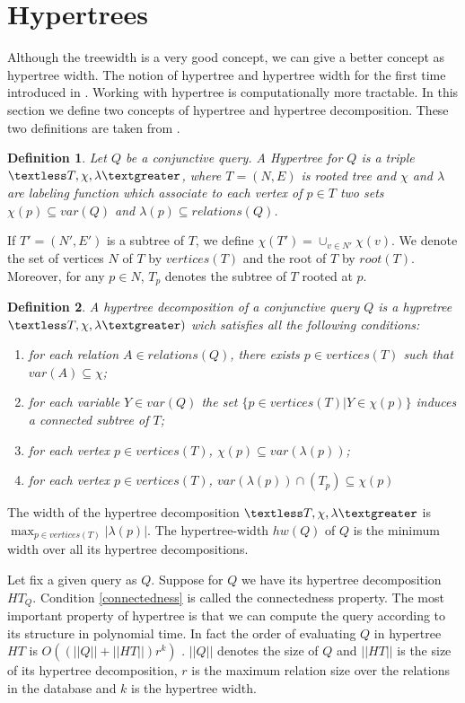\documentclass[12pt]{article}
\newtheorem{definition}{Definition}
\begin{document}
\section{Hypertrees}
Although the treewidth is a very good concept, we can give a better concept as hypertree width. The notion of hypertree and hypertree width for the first time introduced in \cite{1}. Working with hypertree is computationally more tractable. 
In this section we define two concepts of hypertree and hypertree decomposition.
These two definitions are taken from \cite{1}.
\begin{definition}
\label{def:ht}
Let $Q$ be a conjunctive query. A Hypertree for $Q$ is a triple $\textless T,\chi,\lambda\textgreater$, where  $T=(N,E)$ is rooted tree and $\chi$ and $\lambda$ are labeling function which associate to each vertex of $p\in T$ two sets $\chi(p)\subseteq var(Q)$ and $\lambda(p)\subseteq relations(Q)$.
\end{definition}
If $T'=(N',E')$ is a subtree of $T$, we define $\chi(T')=\cup_{v\in N'}\chi(v)$. We denote the set of vertices $N$ of $T$ by $vertices(T)$ and the root of $T$ by $root(T)$. Moreover, for any $p\in N$, $T_{p}$ denotes the subtree of $T$ rooted at $p$.
\begin{definition}
\label{def:htd}
A hypertree decomposition of a conjunctive query $Q$ is a hypretree $\textless T,\chi,\lambda\textgreater)$ wich satisfies all the following conditions:
\begin{enumerate}
\item for each relation $A\in relations(Q)$, there exists $p\in vertices(T)$ such that $var(A)\subseteq \chi$;
\item for each variable $Y\in var(Q)$ the set $\{p\in vertices(T)|Y\in\chi(p)\}$ induces a connected subtree of $T$;\label{connectedness}
\item for each vertex $p\in vertices(T)$, $\chi(p)\subseteq var(\lambda(p))$;
\item for each vertex $p\in vertices(T)$, $var(\lambda(p))\cap(T_{p})\subseteq \chi(p)$
\end{enumerate}
\end{definition}
The width of the hypertree decomposition $\textless T,\chi,\lambda\textgreater$ is $\max_{p\in vertices(T)}|\lambda(p)|$. The hypertree-width $hw(Q)$ of $Q$ is the minimum width over all its hypertree decompositions.\par
Let fix a given query  as $Q$. Suppose for $Q$  we have its hypertree decomposition $HT_{Q}$. 
Condition \ref{connectedness} is called the connectedness property. The most important property of hypertree is that we can compute the query according to its structure in polynomial time. In fact the order of evaluating $Q$ in hypertree $HT$ is $O((||Q||+||HT||)r^{k})$ \cite{1}. $||Q||$ denotes the size of $Q$ and $||HT||$ is the size of its hypertree decomposition, $r$ is the maximum relation size over the relations in the database and $k$ is the hypertree width. \par
\end{document}
